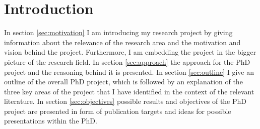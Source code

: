 \section*{Introduction}
%
In section \ref{sec:motivation} I am introducing my research project by giving information about the relevance of the research area and the motivation and vision behind the project. 
Furthermore, I am embedding the project in the bigger picture of the research field. In section \ref{sec:approach} the approach for the PhD project and the reasoning behind it
is presented. In section \ref{sec:outline} I give an outline of the overall PhD project, which is followed by an explanation of the three key areas of the project that I have identified
 in the context of the relevant literature. In section \ref{sec:objectives} possible results and objectives of the PhD project are presented in form of publication targets and ideas 
 for possible presentations within the PhD. 


